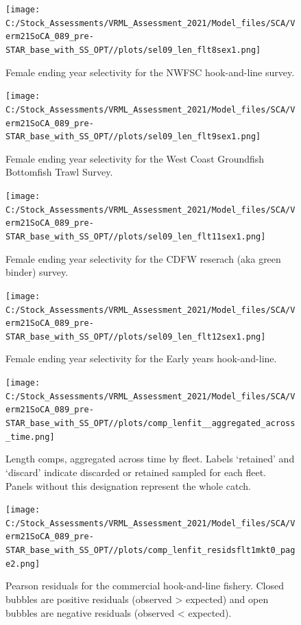 \documentclass[
  english,
  a4paper,
]{article}
\begin{document}
\begin{figure}
\centering
\texttt{[image: C:/Stock\_Assessments/VRML\_Assessment\_2021/Model\_files/SCA/Verm21SoCA\_089\_pre-STAR\_base\_with\_SS\_OPT//plots/sel09\_len\_flt8sex1.png]}
\caption{Female ending year selectivity for the NWFSC hook-and-line survey.\label{fig:endyr-selex-NWFSC-HKL}}
\end{figure}

\begin{figure}
\centering
\texttt{[image: C:/Stock\_Assessments/VRML\_Assessment\_2021/Model\_files/SCA/Verm21SoCA\_089\_pre-STAR\_base\_with\_SS\_OPT//plots/sel09\_len\_flt9sex1.png]}
\caption{Female ending year selectivity for the West Coast Groundfish Bottomfish Trawl Survey.\label{fig:endyr-selex-NWFSC-TWL}}
\end{figure}

\begin{figure}
\centering
\texttt{[image: C:/Stock\_Assessments/VRML\_Assessment\_2021/Model\_files/SCA/Verm21SoCA\_089\_pre-STAR\_base\_with\_SS\_OPT//plots/sel09\_len\_flt11sex1.png]}
\caption{Female ending year selectivity for the CDFW reserach (aka green binder) survey.\label{fig:endyr-selex-CDFW-RESEARCH}}
\end{figure}

\begin{figure}
\centering
\texttt{[image: C:/Stock\_Assessments/VRML\_Assessment\_2021/Model\_files/SCA/Verm21SoCA\_089\_pre-STAR\_base\_with\_SS\_OPT//plots/sel09\_len\_flt12sex1.png]}
\caption{Female ending year selectivity for the Early years hook-and-line.\label{fig:endyr-selex-EARLY-HKL}}
\end{figure}

\FloatBarrier

\clearpage
\FloatBarrier

\FloatBarrier

\begin{figure}
\centering
\texttt{[image: C:/Stock\_Assessments/VRML\_Assessment\_2021/Model\_files/SCA/Verm21SoCA\_089\_pre-STAR\_base\_with\_SS\_OPT//plots/comp\_lenfit\_\_aggregated\_across\_time.png]}
\caption{Length comps, aggregated across time by fleet.
Labels `retained' and `discard' indicate discarded or retained sampled for each fleet. Panels without this designation represent the whole catch.\label{fig:lenfits-all}}
\end{figure}

\FloatBarrier

\begin{figure}
\centering
\texttt{[image: C:/Stock\_Assessments/VRML\_Assessment\_2021/Model\_files/SCA/Verm21SoCA\_089\_pre-STAR\_base\_with\_SS\_OPT//plots/comp\_lenfit\_residsflt1mkt0\_page2.png]}
\caption{Pearson residuals for the commercial hook-and-line fishery. Closed bubbles are positive residuals (observed \textgreater{} expected) and open bubbles are negative residuals (observed \textless{} expected).\label{fig:len-pearson-COM_HKL}}
\end{figure}
\end{document}
